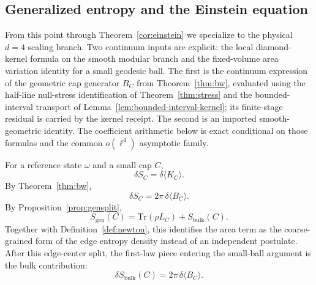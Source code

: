 \documentclass[11pt]{article}
\begin{document}
\subsection{Generalized entropy and the Einstein equation}

From this point through Theorem~\ref{cor:einstein} we specialize to the
physical \(d=4\) scaling branch. Two continuum inputs are explicit: the local
diamond-kernel formula on the smooth modular branch and the fixed-volume area
variation identity for a small geodesic ball. The first is the continuum
expression of the geometric cap generator \(B_C\) from
Theorem~\ref{thm:bw}, evaluated using the half-line null-stress identification
of Theorem~\ref{thm:stress} and the bounded-interval transport of
Lemma~\ref{lem:bounded-interval-kernel}; its finite-stage residual is carried
by the kernel receipt. The second is an imported smooth-geometric identity.
The coefficient arithmetic below is exact conditional on those formulas and
the common \(o(\ell^4)\) asymptotic family.

For a reference state $\omega$ and a small cap $C$,
\[
\delta S_C=\delta \langle K_C\rangle.
\]
By Theorem~\ref{thm:bw},
\[
\delta S_C = 2\pi\,\delta\langle B_C\rangle.
\]
By Proposition~\ref{prop:gensplit},
\[
S_{\mathrm{gen}}(C)=\mathrm{Tr}(\rho L_C)+S_{\mathrm{bulk}}(C).
\]
Together with Definition~\ref{def:newton}, this identifies the area term as the coarse-grained form of the edge entropy density instead of an independent postulate. After this edge-center split, the first-law piece entering the small-ball argument is the bulk contribution:
\[
\delta S_{\mathrm{bulk}}(C)=2\pi\,\delta\langle B_C\rangle.
\]
\end{document}

